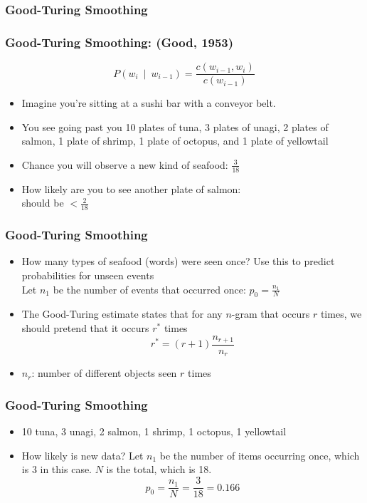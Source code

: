 \subsubsection{Good-Turing Smoothing}

\begin{frame}
\frametitle{Good-Turing Smoothing: (Good, 1953)} 
\[ P(w_i~\mid~w_{i-1}) = \frac{ c(w_{i-1},w_i) } { c(w_{i-1}) } \]
\begin{itemize}[<+->]
\item Imagine you're sitting at a sushi bar with a conveyor belt. 
\item You see going past you  { \color{blue} 10} plates of tuna,  { \color{blue} 3} plates of unagi,  { \color{blue} 2} plates of salmon,  { \color{blue} 1} plate of shrimp,  { \color{blue} 1} plate of octopus, and  { \color{blue} 1} plate of yellowtail
\item Chance you will observe a \alert{new} kind of seafood: {\color{blue} $\frac{3}{18}$}
\item How likely are you to see another plate of salmon: \\
should be { \color{blue} $< \frac{2}{18}$ }
\end{itemize}
\end{frame}

\begin{frame}
\frametitle{Good-Turing Smoothing}
\begin{itemize}[<+->]
\item How many types of seafood (words) were seen once? Use this to predict probabilities for unseen events\\
Let $n_1$ be the number of events that occurred once: 
{ \color{blue} $p_0 = \frac{ n_1 }{ N } $}
\item The Good-Turing estimate states that for any $n$-gram that occurs $r$ times, we should pretend that it occurs $r^\ast$ times
{\color{blue} \[ r^\ast = (r+1) \frac{ n_{r+1} }{ n_r } \] }
\item {\color{blue} $n_r$}: number of different objects seen $r$ times
\end{itemize}
\end{frame}

\begin{frame}
\frametitle{Good-Turing Smoothing}
\begin{itemize}[<+->]
\item { \color{blue} 10} tuna,  { \color{blue} 3} unagi,  { \color{blue} 2} salmon,  { \color{blue} 1} shrimp,  { \color{blue} 1} octopus,  { \color{blue} 1} yellowtail
\item How likely is new data? Let $n_1$ be the number of items occurring once, which is {\color{blue} 3} in this case. $N$ is the total, which is {\color{blue} 18}.
\[ p_0 = \frac{n_1}{N} = \frac{3}{18} = 0.166 \]
\end{itemize}
\end{frame}

